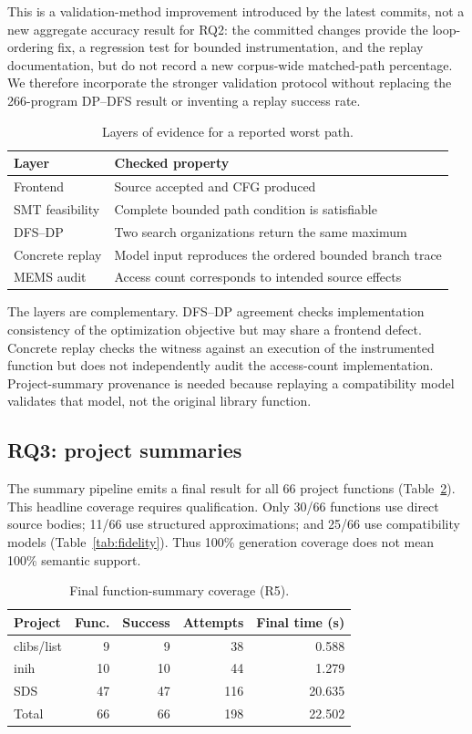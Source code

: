 \documentclass[10pt,conference]{IEEEtran}
\begin{document}
This is a validation-method improvement introduced by the latest commits, not a new aggregate accuracy result for RQ2: the committed changes provide the loop-ordering fix, a regression test for bounded instrumentation, and the replay documentation, but do not record a new corpus-wide matched-path percentage. We therefore incorporate the stronger validation protocol without replacing the 266-program DP--DFS result or inventing a replay success rate.

\begin{table}[t]
\centering
\caption{Layers of evidence for a reported worst path.}
\label{tab:evidence-layers}
\begin{tabular}{p{}p{}}
\toprule
Layer & Checked property\\
\midrule
Frontend & Source accepted and CFG produced\\
SMT feasibility & Complete bounded path condition is satisfiable\\
DFS--DP & Two search organizations return the same maximum\\
Concrete replay & Model input reproduces the ordered bounded branch trace\\
MEMS audit & Access count corresponds to intended source effects\\
\bottomrule
\end{tabular}
\end{table}

The layers are complementary. DFS--DP agreement checks implementation consistency of the optimization objective but may share a frontend defect. Concrete replay checks the witness against an execution of the instrumented function but does not independently audit the access-count implementation. Project-summary provenance is needed because replaying a compatibility model validates that model, not the original library function.

\subsection{RQ3: project summaries}
The summary pipeline emits a final result for all 66 project functions (Table~\ref{tab:summary}). This headline coverage requires qualification. Only 30/66 functions use direct source bodies; 11/66 use structured approximations; and 25/66 use compatibility models (Table~\ref{tab:fidelity}). Thus 100\% generation coverage does not mean 100\% semantic support.

\begin{table}[t]
\centering
\caption{Final function-summary coverage (R5).}
\label{tab:summary}
\begin{tabular}{lrrrr}
\toprule
Project & Func. & Success & Attempts & Final time (s)\\
\midrule
clibs/list & 9 & 9 & 38 & 0.588\\
inih & 10 & 10 & 44 & 1.279\\
SDS & 47 & 47 & 116 & 20.635\\
\midrule
Total & 66 & 66 & 198 & 22.502\\
\bottomrule
\end{tabular}
\end{table}
\end{document}
